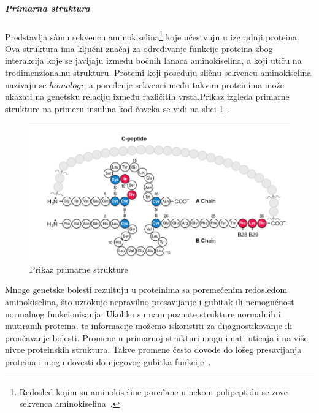 \subparagraph{Primarna struktura}
Predstavlja s\^amu sekvencu aminokiselina\footnote{Redosled kojim su aminokiseline poređane u nekom polipeptidu se zove sekvenca aminokiselina~\cite{spasic}.} koje učestvuju u izgradnji proteina. Ova struktura ima ključni značaj za određivanje funkcije proteina zbog interakcija koje se javljaju između bočnih lanaca aminokiselina, a koji utiču na trodimenzionalnu strukturu. Proteini koji poseduju sličnu sekvencu aminokiselina nazivaju se $homologi$, a poređenje sekvenci među takvim proteinima može ukazati na genetsku relaciju između različitih vrsta.Prikaz izgleda primarne strukture na primeru insulina kod čoveka se vidi na slici \ref{fig:insulin}~\cite{spasic}.\\
\begin{figure}[h]
	\centering
    \includegraphics[width=1\textwidth]{Figures/BO/insulin.png}
    \caption{Prikaz primarne strukture~\cite{bmbg}}
    \label{fig:insulin}
\end{figure}

Mnoge genetske bolesti rezultuju u proteinima sa poremećenim redosledom aminokiselina, što uzrokuje nepravilno presavijanje i gubitak ili nemogućnost normalnog funkcionisanja. Ukoliko su nam poznate strukture normalnih i mutiranih proteina, te informacije možemo iskoristiti za dijagnostikovanje ili proučavanje bolesti. Promene u primarnoj strukturi mogu imati uticaja i na više nivoe proteinskih struktura. Takve promene često dovode do lošeg presavijanja proteina i mogu dovesti do njegovog gubitka funkcije~\cite{flash,lippincott}.

